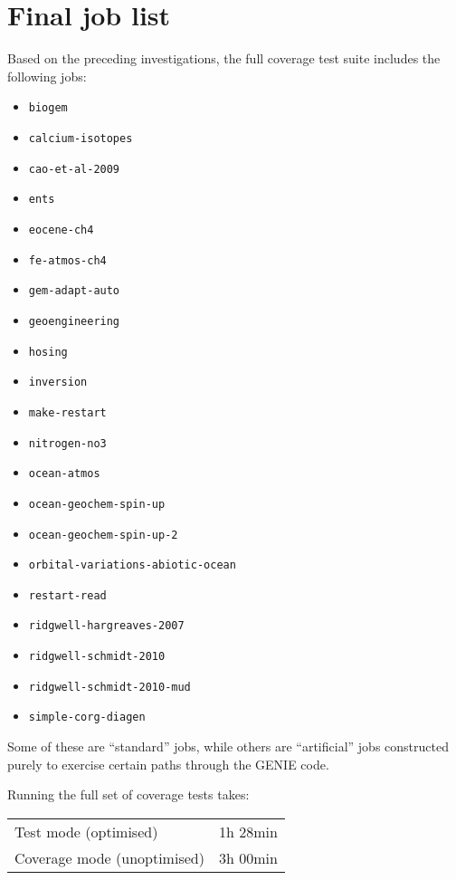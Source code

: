 \documentclass[a4paper,10pt,article]{memoir}
\begin{document}
\chapter{Final job list}

Based on the preceding investigations, the full coverage test suite
includes the following jobs:
\begin{itemize}
  \setlength\itemsep{0pt}
  \item{\texttt{biogem}}
  \item{\texttt{calcium-isotopes}}
  \item{\texttt{cao-et-al-2009}}
  \item{\texttt{ents}}
  \item{\texttt{eocene-ch4}}
  \item{\texttt{fe-atmos-ch4}}
  \item{\texttt{gem-adapt-auto}}
  \item{\texttt{geoengineering}}
  \item{\texttt{hosing}}
  \item{\texttt{inversion}}
  \item{\texttt{make-restart}}
  \item{\texttt{nitrogen-no3}}
  \item{\texttt{ocean-atmos}}
  \item{\texttt{ocean-geochem-spin-up}}
  \item{\texttt{ocean-geochem-spin-up-2}}
  \item{\texttt{orbital-variations-abiotic-ocean}}
  \item{\texttt{restart-read}}
  \item{\texttt{ridgwell-hargreaves-2007}}
  \item{\texttt{ridgwell-schmidt-2010}}
  \item{\texttt{ridgwell-schmidt-2010-mud}}
  \item{\texttt{simple-corg-diagen}}
\end{itemize}

Some of these are ``standard'' jobs, while others are ``artificial''
jobs constructed purely to exercise certain paths through the GENIE
code.

Running the full set of coverage tests takes:
\begin{center}
\begin{tabular}{ll}
  Test mode (optimised)       & 1h 28min \\
  Coverage mode (unoptimised) & 3h 00min
\end{tabular}
\end{center}
\end{document}
